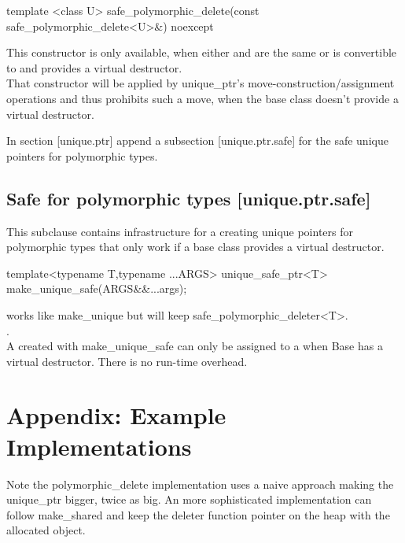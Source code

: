 \documentclass[ebook,11pt,article]{memoir}
\begin{document}
\begin{itemdecl}
template <class U>
safe_polymorphic_delete(const safe_polymorphic_delete<U>&) noexcept 
\end{itemdecl}
\pnum
\effects This constructor is only available, when either  and  are the same or  is convertible to  and  provides a virtual destructor.
\\
\pnum
\enternote
That constructor will be applied by unique_ptr's move-construction/assignment operations and thus prohibits such a move, when the base class doesn't provide a virtual destructor.
\exitnote


In section [unique.ptr] append a subsection [unique.ptr.safe] for the safe unique pointers for polymorphic types.
\\

\section{Safe  for polymorphic types [unique.ptr.safe]}
\pnum
This subclause contains infrastructure for a creating unique pointers for polymorphic types that only work if a base class provides a virtual destructor.\\

\begin{itemdecl}
template<typename T,typename ...ARGS>
unique_safe_ptr<T> make_unique_safe(ARGS&&...args);
\end{itemdecl}

\pnum
\effects works like make_unique but will keep safe_polymorphic_deleter<T>. 
\\

\pnum
\returns {}.
\\

\pnum
\enternote
A  created with make_unique_safe can only be assigned to a  when Base has a virtual destructor. There is no run-time overhead.
\exitnote



\chapter{Appendix: Example Implementations}
Note the polymorphic_delete implementation uses a naive approach making the unique_ptr bigger, twice as big. An more sophisticated implementation can follow make_shared and keep the deleter function pointer on the heap with the allocated object.
\end{document}
